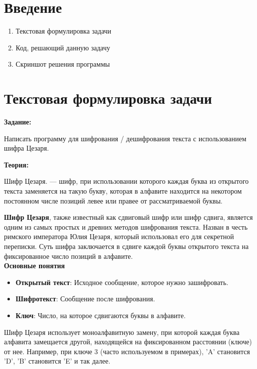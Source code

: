 \documentclass[12pt,a4paper]{scrartcl}
\begin{document}
\tableofcontents %

\newpage

\section{Введение}
\label{sec:intro}

\begin{enumerate}
 \item Текстовая формулировка задачи
 \item Код, решающий данную задачу
 \item Скриншот решения программы
\end{enumerate}
\section{Текстовая формулировка задачи} 
\textbf {Задание:} 

Написать программу для шифрования / дешифрования текста с использованием шифра Цезаря.

\textbf{Теория:}

Шифр Цезаря\cite{Шифр Цезаря:1}. — шифр, при использовании которого каждая буква из открытого текста заменяется на такую букву, которая в алфавите находится на некотором постоянном числе позиций левее или правее от рассматриваемой буквы.

\textbf{Шифр Цезаря}, также известный как сдвиговый шифр или шифр сдвига, является одним из самых простых и древних методов шифрования текста. Назван в честь римского императора Юлия Цезаря, который использовал его для секретной переписки. Суть шифра заключается в сдвиге каждой буквы открытого текста на фиксированное число позиций в алфавите.\\
\textbf{Основные понятия}
\begin{itemize}
    \item \textbf{Открытый текст}: Исходное сообщение, которое нужно зашифровать.
    \item \textbf{Шифротекст}: Сообщение после шифрования.
    \item \textbf{Ключ}: Число, на которое сдвигаются буквы в алфавите.
\end{itemize}
Шифр Цезаря использует моноалфавитную замену, при которой каждая буква алфавита замещается другой, находящейся на фиксированном расстоянии (ключе) от нее. Например, при ключе 3 (часто используемом в примерах), 'A' становится 'D', 'B' становится 'E' и так далее.
\end{document}
